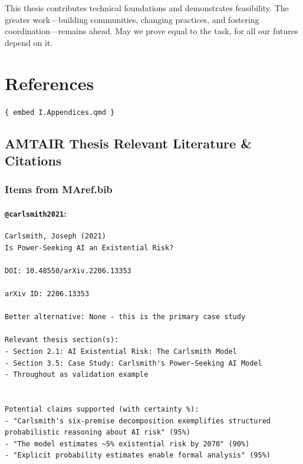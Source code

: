 \documentclass[
  11pt,
  letterpaper,
]{book}
\begin{document}
This thesis contributes technical foundations and demonstrates
feasibility. The greater work---building communities, changing
practices, and fostering coordination---remains ahead. May we prove
equal to the task, for all our futures depend on it.


\chapter*{References}\label{sec-references}


\printbibliography[heading=none]

\texttt{\{\ embed\ I.Appendices.qmd\ \}}

\section*{AMTAIR Thesis Relevant Literature \&
Citations}\label{amtair-thesis-relevant-literature-citations}


\subsection*{Items from MAref.bib}\label{items-from-maref.bib}

\subsubsection*{\texorpdfstring{\texttt{@carlsmith2021}:
\textcite{carlsmith2021}}{@carlsmith2021: @carlsmith2021}}\label{carlsmith2021-carlsmith2021}

\begin{verbatim}
Carlsmith, Joseph (2021)
Is Power-Seeking AI an Existential Risk?

DOI: 10.48550/arXiv.2206.13353

arXiv ID: 2206.13353

Better alternative: None - this is the primary case study

Relevant thesis section(s): 
- Section 2.1: AI Existential Risk: The Carlsmith Model
- Section 3.5: Case Study: Carlsmith's Power-Seeking AI Model
- Throughout as validation example


Potential claims supported (with certainty %):
- "Carlsmith's six-premise decomposition exemplifies structured probabilistic reasoning about AI risk" (95%)
- "The model estimates ~5% existential risk by 2070" (90%)
- "Explicit probability estimates enable formal analysis" (95%)
\end{verbatim}
\end{document}
